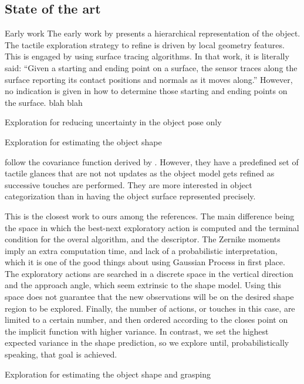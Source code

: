 \subsection{State of the art}
\label{sec:SoA}

{\color{red} Early work}
The early work by \citet{Allen1987Robotic} presents a hierarchical representation of the object. The tactile exploration strategy to refine is driven by local geometry features. This is engaged by using surface tracing algorithms. In that work, it is literally said: ``Given a starting and ending point on a surface, the sensor traces along the surface reporting its contact positions and normals as it moves along.'' However, no indication is given in how to determine those starting and ending points on the surface. \citet{Allen1990Acquisition} blah blah

{\color{red} Exploration for reducing uncertainty in the object pose only}

\citet{Petrovskaya2011Global}

{\color{red} Exploration for estimating the object shape}

\citet{Bjorkman2013Enhancing} follow the covariance function derived by \citet{Williams2007Gaussian}. However, they have a predefined set of tactile glances that are not not updates as the object model gets refined as successive touches are performed. They are more interested in object categorization than in having the object surface represented precisely.

This is the closest work to ours among the references. The main difference being the space in which the best-next exploratory action is computed and the terminal condition for the overal algorithm, and the descriptor. The Zernike moments imply an extra computation time, and lack of a probabilistic interpretation, which it is one of the good things about using Gaussian Process in first place. The exploratory actions are searched in a discrete space in the vertical direction and the approach angle, which seem extrinsic to the shape model. Using this space does not guarantee that the new observations will be on the desired shape region to be explored.  Finally, the number of actions, or touches in this case, are limited to a certain number, and then ordered according to the closes point on the implicit function with higher variance. In contrast, we set the highest expected variance in the shape prediction, so we explore until, probabilistically speaking, that goal is achieved.

{\color{red} Exploration for estimating the object shape and grasping}

